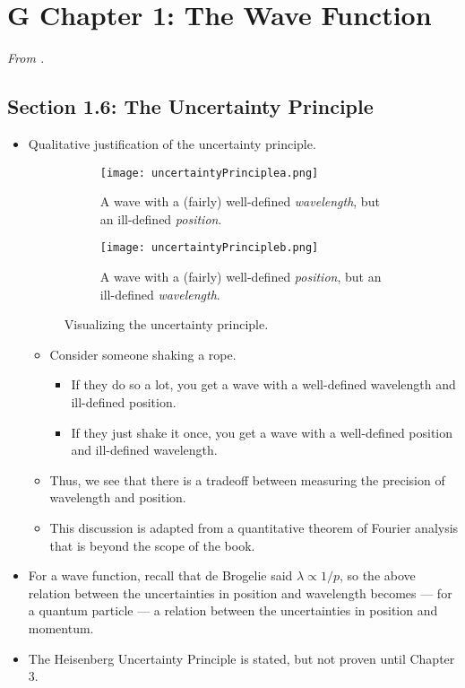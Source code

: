 \documentclass[../notes.tex]{subfiles}
\begin{document}
\section{G Chapter 1: The Wave Function}
\emph{From \textcite{bib:Griffiths}.}
\subsection*{Section 1.6: The Uncertainty Principle}
\begin{itemize}
    \item {}Qualitative justification of the uncertainty principle.
    \begin{figure}[h!]
        \centering
        \begin{subfigure}[b]{\linewidth}
            \centering
            \texttt{[image: uncertaintyPrinciplea.png]}
            \caption{A wave with a (fairly) well-defined \emph{wavelength}, but an ill-defined \emph{position}.}
            \label{fig:uncertaintyPrinciplea}
        \end{subfigure}
        \begin{subfigure}[b]{\linewidth}
            \centering
            \texttt{[image: uncertaintyPrincipleb.png]}
            \caption{A wave with a (fairly) well-defined \emph{position}, but an ill-defined \emph{wavelength}.}
            \label{fig:uncertaintyPrincipleb}
        \end{subfigure}
        \caption{Visualizing the uncertainty principle.}
        \label{fig:uncertaintyPrinciple}
    \end{figure}
    \begin{itemize}
        \item Consider someone shaking a rope.
        \begin{itemize}
            \item If they do so a lot, you get a wave with a well-defined wavelength and ill-defined position.
            \item If they just shake it once, you get a wave with a well-defined position and ill-defined wavelength.
        \end{itemize}
        \item Thus, we see that there is a tradeoff between measuring the precision of wavelength and position.
        \item This discussion is adapted from a quantitative theorem of Fourier analysis that is beyond the scope of the book.
    \end{itemize}
    \item For a wave function, recall that de Brogelie said $\lambda\propto 1/p$, so the above relation between the uncertainties in position and wavelength becomes --- for a quantum particle --- a relation between the uncertainties in position and momentum.
    \item The Heisenberg Uncertainty Principle is stated, but not proven until Chapter 3.
\end{itemize}
\end{document}
